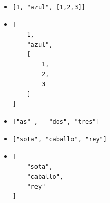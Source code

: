 \documentclass[ucs]{beamer}
\begin{document}
\begin{frame}[fragile]
\frametitle{}
\begin{itemize}

\item

  \begin{footnotesize}
  \begin{verbatim}
[1, "azul", [1,2,3]]
  \end{verbatim}
  \end{footnotesize}



\item
  \begin{footnotesize}
  \begin{verbatim}
[
    1, 
    "azul", 
    [
        1, 
        2, 
        3
    ]
]
  \end{verbatim}
  \end{footnotesize}



\item
  \begin{footnotesize}
  \begin{verbatim}
["as" ,   "dos", "tres"]
  \end{verbatim}
  \end{footnotesize}


\item
  \begin{footnotesize}
  \begin{verbatim}
["sota", "caballo", "rey"]
  \end{verbatim}
  \end{footnotesize}

\item
  \begin{footnotesize}
  \begin{verbatim}
[
    "sota",
    "caballo",
    "rey"
]
  \end{verbatim}
  \end{footnotesize}

\end{itemize}

\end{frame}
\end{document}
